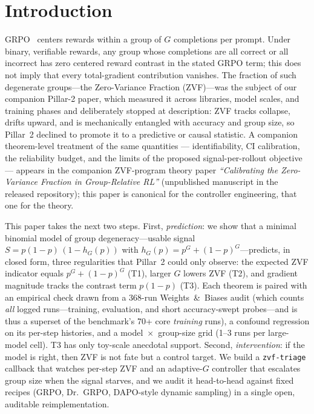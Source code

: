 \section{Introduction}
\label{sec:p7-intro}
GRPO~\citep{shao2024deepseekmath, guo2025deepseekr1} centers rewards within a
group of $G$ completions per prompt. Under binary, verifiable rewards, any
group whose completions are all correct or all incorrect has zero centered
reward contrast in the stated GRPO term; this does not imply that every
total-gradient contribution vanishes. The fraction of such degenerate groups---the Zero-Variance
Fraction (ZVF)---was the subject of our companion Pillar-2 paper, which
measured it across libraries, model scales, and training phases and
deliberately stopped at description: ZVF tracks collapse, drifts upward, and
is mechanically entangled with accuracy and group size, so Pillar~2 declined
to promote it to a predictive or causal statistic. A companion
theorem-level treatment of the same quantities --- identifiability, CI
calibration, the reliability budget, and the limits of the proposed
signal-per-rollout objective --- appears in the companion ZVF-program theory
paper \emph{``Calibrating the Zero-Variance Fraction in Group-Relative RL''}
(unpublished manuscript in the released repository); this paper is canonical
for the controller engineering, that one for the theory.

This paper takes the next two steps. First, \emph{prediction}: we show that a
minimal binomial model of group degeneracy---usable signal
$S = p(1-p)\,(1 - h_G(p))$ with $h_G(p) = p^G + (1-p)^G$---predicts, in
closed form, three regularities that Pillar~2 could only observe: the
expected ZVF indicator equals $p^G + (1-p)^G$ (T1), larger $G$ lowers ZVF
(T2), and gradient magnitude tracks the contrast term $p(1-p)$ (T3). Each
theorem is paired with an empirical check drawn from a 368-run
Weights~\&~Biases audit (which counts \emph{all} logged runs---training,
evaluation, and short accuracy-swept probes---and is thus a superset of the
benchmark's 70+ core \emph{training} runs), a confound regression on its
per-step histories, and a model~$\times$~group-size grid (1--3 runs per large-model cell).
T3 has only toy-scale anecdotal support. Second, \emph{intervention}: if the model
is right, then ZVF is not fate but a control target. We build a
\texttt{zvf-triage} callback that watches per-step ZVF and an adaptive-$G$
controller that escalates group size when the signal starves, and we audit it
head-to-head against fixed recipes (GRPO, Dr.~GRPO, DAPO-style dynamic
sampling) in a single open, auditable reimplementation.

